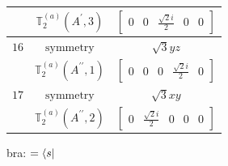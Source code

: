 \documentclass[fleqn,8pt,landscape]{jsarticle}
\begin{document}
\begin{longtable}{ccc}
$  $ & $ \mathbb{T}_{2}^{(a)}(A^{\prime},3) $ & $ \begin{bmatrix} 0 & 0 & \frac{\sqrt{2} i}{2} & 0 & 0 \end{bmatrix} $ \\ \hline
$ 16 $ & $ \text{symmetry} $ & $ \sqrt{3} y z $ \\
$  $ & $ \mathbb{T}_{2}^{(a)}(A^{\prime\prime},1) $ & $ \begin{bmatrix} 0 & 0 & 0 & \frac{\sqrt{2} i}{2} & 0 \end{bmatrix} $ \\ \hline
$ 17 $ & $ \text{symmetry} $ & $ \sqrt{3} x y $ \\
$  $ & $ \mathbb{T}_{2}^{(a)}(A^{\prime\prime},2) $ & $ \begin{bmatrix} 0 & \frac{\sqrt{2} i}{2} & 0 & 0 & 0 \end{bmatrix} $ \\ \hline
\end{longtable}
bra: $=\bra{s}$
\end{document}
